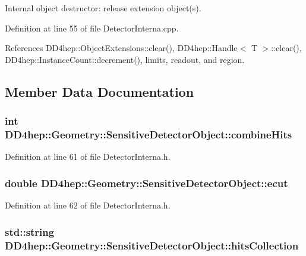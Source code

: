 Internal object destructor: release extension object(s). 

Definition at line 55 of file DetectorInterna.cpp.

References DD4hep::ObjectExtensions::clear(), DD4hep::Handle$<$ T $>$::clear(), DD4hep::InstanceCount::decrement(), limits, readout, and region.

\subsection{Member Data Documentation}
\hypertarget{class_d_d4hep_1_1_geometry_1_1_sensitive_detector_object_aec18ccc329468200900de0fabf900e76}{
\subsubsection[{combineHits}]{\setlength{\rightskip}{0pt plus 5cm}int {\bf DD4hep::Geometry::SensitiveDetectorObject::combineHits}}}
\label{class_d_d4hep_1_1_geometry_1_1_sensitive_detector_object_aec18ccc329468200900de0fabf900e76}


Definition at line 61 of file DetectorInterna.h.\hypertarget{class_d_d4hep_1_1_geometry_1_1_sensitive_detector_object_a1c51c612aaac8b1ae21daf7030f0659a}{
\subsubsection[{ecut}]{\setlength{\rightskip}{0pt plus 5cm}double {\bf DD4hep::Geometry::SensitiveDetectorObject::ecut}}}
\label{class_d_d4hep_1_1_geometry_1_1_sensitive_detector_object_a1c51c612aaac8b1ae21daf7030f0659a}


Definition at line 62 of file DetectorInterna.h.\hypertarget{class_d_d4hep_1_1_geometry_1_1_sensitive_detector_object_abf517c287f2744812828ba3e7c12a4f1}{
\subsubsection[{hitsCollection}]{\setlength{\rightskip}{0pt plus 5cm}std::string {\bf DD4hep::Geometry::SensitiveDetectorObject::hitsCollection}}}
\label{class_d_d4hep_1_1_geometry_1_1_sensitive_detector_object_abf517c287f2744812828ba3e7c12a4f1}


